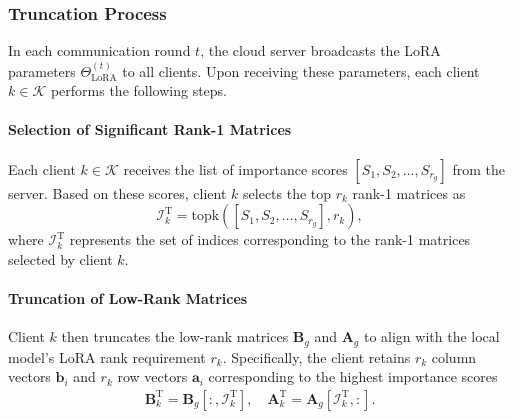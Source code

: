 \documentclass[journal]{IEEEtran}
\begin{document}
\subsubsection{Truncation Process}
In each communication round $t$, the cloud server broadcasts the LoRA parameters \(\Theta_{\text{LoRA}}^{(t)}\) to all clients. Upon receiving these parameters, each client \(k \in \mathcal{K}\) performs the following steps.
\paragraph{Selection of Significant Rank-1 Matrices}
Each client \(k \in \mathcal{K}\) receives the list of importance scores \([S_1, S_2, \ldots, S_{r_g}]\) from the server. Based on these scores, client \(k\) selects the top \(r_k\) rank-1 matrices as
\begin{equation}
\label{Ik_1}
\mathcal{I}_k^{\text{T}} = \text{topk}\left([S_1, S_2, \ldots, S_{r_g}], r_k\right),
\end{equation}
where $\mathcal{I}_k^{\text{T}}$ represents the set of indices corresponding to the rank-1 matrices selected by client $k$.

\paragraph{Truncation of Low-Rank Matrices} Client \(k\) then truncates the low-rank matrices \(\mathbf{B}_g\) and \(\mathbf{A}_g\) to align with the local model's LoRA rank requirement $r_k$. Specifically, the client retains \(r_k\) column vectors \(\mathbf{b}_i\) and \(r_k\) row vectors \(\mathbf{a}_i\) corresponding to the highest importance scores
\begin{equation}
\label{B_kA_k}
\begin{aligned}
\mathbf{B}_k^{\text{T}} = \mathbf{B}_g[:, \mathcal{I}_k^{\text{T}}],  \quad \mathbf{A}_k^{\text{T}} = \mathbf{A}_g[\mathcal{I}_k^{\text{T}}, :].
\end{aligned}
\end{equation}
\end{document}
